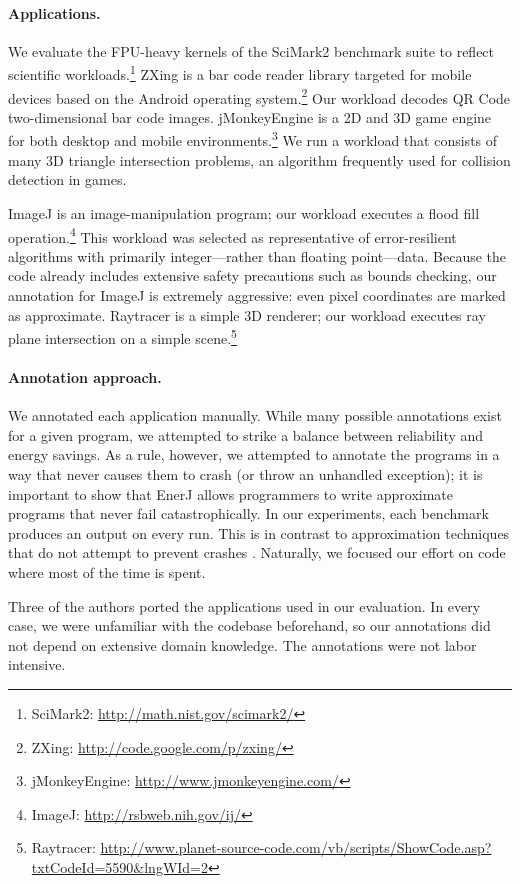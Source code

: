 \paragraph{Applications.} We evaluate the FPU-heavy kernels of the SciMark2 benchmark suite to
reflect scientific workloads.\footnote{SciMark2:
  \url{http://math.nist.gov/scimark2/}} ZXing is a bar code reader library
targeted for mobile devices based on the Android operating
system.\footnote{ZXing: \url{http://code.google.com/p/zxing/}} Our workload
decodes QR Code two-dimensional bar code images. jMonkeyEngine is a 2D
and 3D game engine for both desktop and mobile
environments.\footnote{jMonkeyEngine: \url{http://www.jmonkeyengine.com/}}
We run a workload that consists of many 3D triangle intersection
problems, an algorithm frequently used for collision detection in
games.

ImageJ is an image-manipulation program; our workload executes a flood fill
operation.\footnote{ImageJ: \url{http://rsbweb.nih.gov/ij/}} This workload was
selected as representative of error-resilient algorithms with primarily
integer---rather than floating point---data.
Because the code already includes extensive
safety precautions such as bounds checking, our annotation for ImageJ is
extremely aggressive: even pixel coordinates are marked as approximate.
Raytracer is a simple 3D renderer; our workload executes
ray plane intersection on a simple scene.\footnote{Raytracer:
\url{http://www.planet-source-code.com/vb/scripts/ShowCode.asp?txtCodeId=5590&lngWId=2}}

\paragraph{Annotation approach.} We annotated each application
manually. While many possible
annotations exist for a given program, we attempted to strike a
balance between reliability and energy savings. As a rule, however, we
attempted to annotate the programs in a way that never causes
them to crash (or throw an unhandled exception); it is important to
show that EnerJ allows programmers to write approximate programs that
never fail catastrophically. In our experiments, each benchmark produces
an output on every run. This is in contrast to approximation techniques
that do not attempt to prevent crashes \cite{flikker, wong-selse06, li07}.
Naturally, we focused our effort on code where most of the
time is spent.

Three of the authors ported the applications used in our
evaluation. In every case, we were unfamiliar with the codebase
beforehand, so our annotations did not depend on extensive domain
knowledge. The annotations were not labor intensive.


